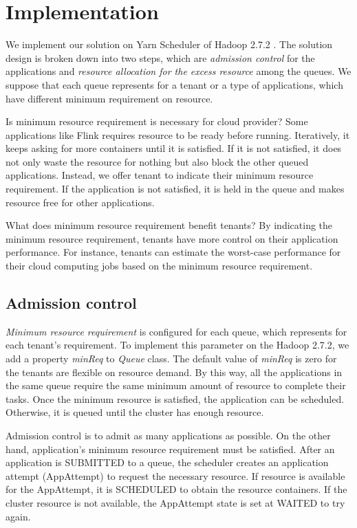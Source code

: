 
\section{Implementation}

We implement our solution on Yarn Scheduler of Hadoop 2.7.2 \cite{yarn}. The solution design is broken down into two steps, which are \emph{admission control} for the applications and \emph{resource allocation for the excess resource} among the queues. We suppose that each queue represents for a tenant or a type of applications, which have different minimum requirement on resource.

Is minimum resource requirement is necessary for cloud provider? Some applications like Flink requires resource to be ready before running. Iteratively, it keeps asking for more containers until it is satisfied. If it is not satisfied, it does not only waste the resource for nothing but also block the other queued applications. Instead, we offer tenant to indicate their minimum resource requirement. If the application is not satisfied, it is held in the queue and makes resource free for other applications. 

What does minimum resource requirement benefit tenants? By indicating the minimum resource requirement, tenants have more control on their application performance. For instance, tenants can estimate the worst-case performance for their cloud computing jobs based on the minimum resource requirement.

\subsection*{Admission control}

\emph{Minimum resource requirement} is configured for each queue, which represents for each tenant's requirement. To implement this parameter on the Hadoop 2.7.2, we add a property \textit{minReq} to \textit{Queue} class. The default value of \textit{minReq} is zero for the tenants are flexible on resource demand. By this way, all the applications in the same queue require the same minimum amount of resource to complete their tasks. Once the minimum resource is satisfied, the application can be scheduled. Otherwise, it is queued until the cluster has enough resource.

Admission control is to admit as many applications as possible. On the other hand, application's minimum resource requirement must be satisfied. After an application is SUBMITTED to a queue, the scheduler creates an application attempt (AppAttempt) to request the necessary resource. If resource is available for the AppAttempt, it is SCHEDULED to obtain the resource containers. If the cluster resource is not available, the AppAttempt state is set at WAITED to try again.

